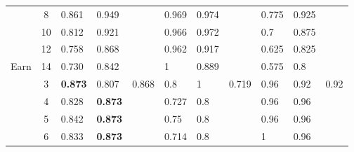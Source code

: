 \begin{table}[]
\begin{tabular}{|c|c|l|l|l|l|l|l|l|l|l|}
                       & 8                     & \cellcolor[HTML]{EFEFEF}0.861          & \cellcolor[HTML]{EFEFEF}0.949          & \cellcolor[HTML]{EFEFEF}      & 0.969    & 0.974    &          & \cellcolor[HTML]{EFEFEF}0.775 & \cellcolor[HTML]{EFEFEF}0.925 & \cellcolor[HTML]{EFEFEF}      \\ \cline{2-11} 
                       & 10                    & \cellcolor[HTML]{EFEFEF}0.812          & \cellcolor[HTML]{EFEFEF}0.921          & \cellcolor[HTML]{EFEFEF}      & 0.966    & 0.972    &          & \cellcolor[HTML]{EFEFEF}0.7   & \cellcolor[HTML]{EFEFEF}0.875 & \cellcolor[HTML]{EFEFEF}      \\ \cline{2-11} 
                       & 12                    & \cellcolor[HTML]{EFEFEF}0.758          & \cellcolor[HTML]{EFEFEF}0.868          & \cellcolor[HTML]{EFEFEF}      & 0.962    & 0.917    &          & \cellcolor[HTML]{EFEFEF}0.625 & \cellcolor[HTML]{EFEFEF}0.825 & \cellcolor[HTML]{EFEFEF}      \\ \cline{2-11} 
\multirow{-9}{*}{Earn} & 14                    & \cellcolor[HTML]{EFEFEF}0.730          & \cellcolor[HTML]{EFEFEF}0.842          & \cellcolor[HTML]{EFEFEF}      & 1        & 0.889    &          & \cellcolor[HTML]{EFEFEF}0.575 & \cellcolor[HTML]{EFEFEF}0.8   & \cellcolor[HTML]{EFEFEF}      \\ \hline
                       & 3                     & \cellcolor[HTML]{EFEFEF}\textbf{0.873} & \cellcolor[HTML]{EFEFEF}0.807          & \cellcolor[HTML]{EFEFEF}0.868 & 0.8      & 1        & 0.719    & \cellcolor[HTML]{EFEFEF}0.96  & \cellcolor[HTML]{EFEFEF}0.92  & \cellcolor[HTML]{EFEFEF}0.92  \\ \cline{2-11} 
                       & 4                     & \cellcolor[HTML]{EFEFEF}0.828          & \cellcolor[HTML]{EFEFEF}\textbf{0.873} & \cellcolor[HTML]{EFEFEF}      & 0.727    & 0.8      &          & \cellcolor[HTML]{EFEFEF}0.96  & \cellcolor[HTML]{EFEFEF}0.96  & \cellcolor[HTML]{EFEFEF}      \\ \cline{2-11} 
                       & 5                     & \cellcolor[HTML]{EFEFEF}0.842          & \cellcolor[HTML]{EFEFEF}\textbf{0.873} & \cellcolor[HTML]{EFEFEF}      & 0.75     & 0.8      &          & \cellcolor[HTML]{EFEFEF}0.96  & \cellcolor[HTML]{EFEFEF}0.96  & \cellcolor[HTML]{EFEFEF}      \\ \cline{2-11} 
                       & 6                     & \cellcolor[HTML]{EFEFEF}0.833          & \cellcolor[HTML]{EFEFEF}\textbf{0.873} & \cellcolor[HTML]{EFEFEF}      & 0.714    & 0.8      &          & \cellcolor[HTML]{EFEFEF}1     & \cellcolor[HTML]{EFEFEF}0.96  & \cellcolor[HTML]{EFEFEF}      \\ \cline{2-11} 

\end{tabular}
\end{table}
